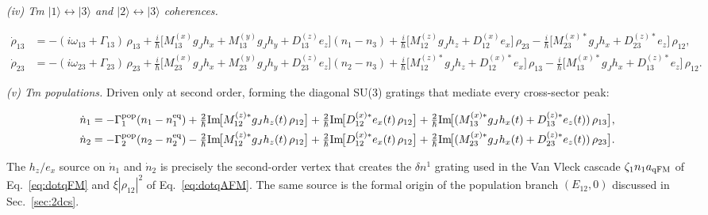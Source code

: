 \documentclass[reprint,amsmath,amssymb,aps,prb,longbibliography]{revtex4-2}
\begin{document}
\medskip
\noindent\emph{(iv) Tm $|1\rangle\!\leftrightarrow\!|3\rangle$ and
$|2\rangle\!\leftrightarrow\!|3\rangle$ coherences.}
\begin{widetext}
\begin{align}
\dot\rho_{13} &= -(i\omega_{13}+\Gamma_{13})\,\rho_{13}
+\tfrac{i}{\hbar}\bigl[M_{13}^{(x)}g_J h_x+M_{13}^{(y)}g_J h_y+D_{13}^{(z)}e_z\bigr](n_1-n_3)
+\tfrac{i}{\hbar}\bigl[M_{12}^{(z)}g_J h_z+D_{12}^{(x)}e_x\bigr]\,\rho_{23}
-\tfrac{i}{\hbar}\bigl[M_{23}^{(x)*}g_J h_x+D_{23}^{(z)*}e_z\bigr]\,\rho_{12},
\label{eq:dotrho13}\\
\dot\rho_{23} &= -(i\omega_{23}+\Gamma_{23})\,\rho_{23}
+\tfrac{i}{\hbar}\bigl[M_{23}^{(x)}g_J h_x+M_{23}^{(y)}g_J h_y+D_{23}^{(z)}e_z\bigr](n_2-n_3)
+\tfrac{i}{\hbar}\bigl[M_{12}^{(z)*}g_J h_z+D_{12}^{(x)*}e_x\bigr]\,\rho_{13}
-\tfrac{i}{\hbar}\bigl[M_{13}^{(x)*}g_J h_x+D_{13}^{(z)*}e_z\bigr]\,\rho_{12}.
\label{eq:dotrho23}
\end{align}
\end{widetext}

\medskip
\noindent\emph{(v) Tm populations.} Driven only at second order,
forming the diagonal SU(3) gratings that mediate every cross-sector
peak:
\begin{widetext}
\begin{align}
\dot n_1 &= -\Gamma_{1}^{\rm pop}(n_1-n_1^{\rm eq})
+\tfrac{2}{\hbar}{\rm Im}\!\bigl[M_{12}^{(z)*}g_J h_z(t)\,\rho_{12}\bigr]
+\tfrac{2}{\hbar}{\rm Im}\!\bigl[D_{12}^{(x)*}e_x(t)\,\rho_{12}\bigr]
+\tfrac{2}{\hbar}{\rm Im}\!\bigl[(M_{13}^{(x)*}g_J h_x(t)+D_{13}^{(z)*}e_z(t))\,\rho_{13}\bigr],
\label{eq:dotn1}\\
\dot n_2 &= -\Gamma_{2}^{\rm pop}(n_2-n_2^{\rm eq})
-\tfrac{2}{\hbar}{\rm Im}\!\bigl[M_{12}^{(z)*}g_J h_z(t)\,\rho_{12}\bigr]
+\tfrac{2}{\hbar}{\rm Im}\!\bigl[D_{12}^{(x)*}e_x(t)\,\rho_{12}\bigr]
+\tfrac{2}{\hbar}{\rm Im}\!\bigl[(M_{23}^{(x)*}g_J h_x(t)+D_{23}^{(z)*}e_z(t))\,\rho_{23}\bigr].
\label{eq:dotn2}
\end{align}
\end{widetext}
The $h_z/e_x$ source on $\dot n_1$ and $\dot n_2$ is precisely the
second-order vertex that creates the $\delta n^1$ grating used in
the Van Vleck cascade $\zeta_1 n_1 a_{\rm qFM}$ of
Eq.~\eqref{eq:dotqFM} and $\xi|\rho_{12}|^2$ of
Eq.~\eqref{eq:dotqAFM}. The same source is the formal origin of the
population branch $(E_{12},0)$ discussed in Sec.~\ref{sec:2dcs}.
\end{document}
